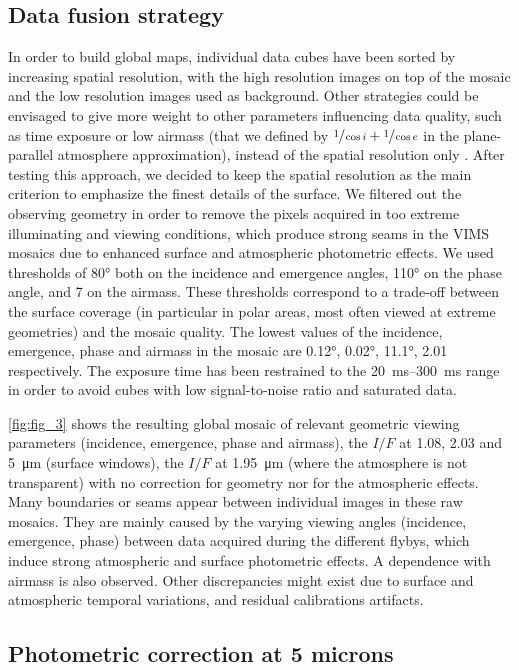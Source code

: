 \documentclass[preprint,twocolumn,5p,authoryear,compress,colorlinks=true]{elsarticle}
\newcommand{\figref}[1]{\autoref{fig:#1}}
\begin{document}
{\subsection{Data fusion strategy}
In order to build global maps, individual data cubes have been sorted by increasing spatial resolution, with the high resolution images on top of the mosaic and the low resolution images used as background.
Other strategies could be envisaged to give more weight to other parameters influencing data quality, such as time exposure or low airmass (that we defined by $\sfrac{1}{\cos i} + \sfrac{1}{\cos e}$ in the plane-parallel atmosphere approximation), instead of the spatial resolution only \citep[\emph{i.e.,}][]{Barnes2007}.
After testing this approach, we decided to keep the spatial resolution as the main criterion to emphasize the finest details of the surface. We filtered out the observing geometry in order to remove the pixels acquired in too extreme illuminating and viewing conditions, which produce strong seams in the VIMS mosaics due to enhanced surface and atmospheric photometric effects. We used thresholds of \ang{80} both on the incidence and emergence angles, \ang{110} on the phase angle, and 7 on the airmass. These thresholds correspond to a trade-off between the surface coverage (in particular in polar areas, most often viewed at extreme geometries) and the mosaic quality. The lowest values of the incidence, emergence, phase and airmass in the mosaic are \ang{0.12}, \ang{0.02}, \ang{11.1}, \num{2.01} respectively. The exposure time has been restrained to the \SIrange{20}{300}{ms} range in order to avoid cubes with low signal-to-noise ratio and saturated data.

\figref{fig_3} shows the resulting global mosaic of relevant geometric viewing parameters (incidence, emergence, phase and airmass), the $I/F$ at \num{1.08}, \num{2.03} and \SI{5}{\um} (surface windows), the $I/F$ at \SI{1.95}{\um} (where the atmosphere is not transparent) with no correction for geometry nor for the atmospheric effects.
Many boundaries or seams appear between individual images in these raw mosaics. They are mainly caused by the varying viewing angles (incidence, emergence, phase) between data acquired during the different flybys, which induce strong atmospheric and surface photometric effects. A dependence with airmass is also observed. Other discrepancies might exist due to surface and atmospheric temporal variations, and residual calibrations artifacts.

\subsection{Photometric correction at 5 microns}\label{ssec:photometric_correction}

}
\end{document}
